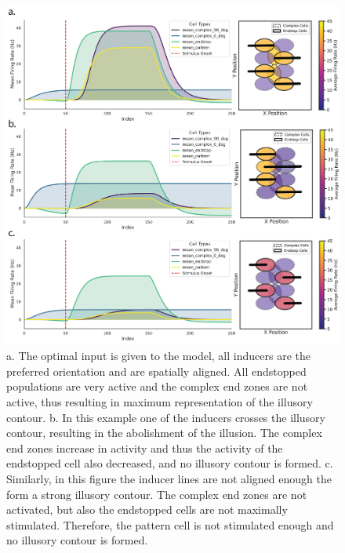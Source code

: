 \documentclass[12pt]{article}
\begin{document}
\begin{figure}[H]
  \centering
  \includegraphics[width=1.0 \textwidth]{figures/Figure_Population_configs.png}
  \caption{a. The optimal input is given to the model, all inducers are the preferred orientation and are spatially aligned. All endstopped populations are very active and the complex end zones are not active, thus resulting in maximum representation of the illusory contour. b. In this example one of the inducers crosses the illusory contour, resulting in the abolishment of the illusion. The complex end zones increase in activity and thus the activity of the endstopped cell also decreased, and no illusory contour is formed. c. Similarly, in this figure the inducer lines are not aligned enough the form a strong illusory contour. The complex end zones are not activated, but also the endstopped cells are not maximally stimulated. Therefore, the pattern cell is not stimulated enough and no illusory contour is formed.}
  \label{fig:population_contours}
\end{figure}

\end{document}
